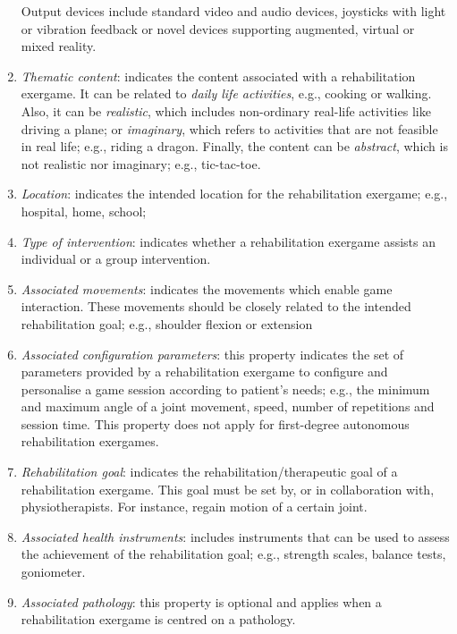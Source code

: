 \begin{enumerate}
    Output devices include standard video and audio devices, joysticks with light or vibration feedback or novel devices supporting augmented, virtual or mixed reality.
    
    \item \emph{Thematic content}: indicates the content associated with a rehabilitation exergame. It can be related to \textit{daily life activities}, e.g., cooking or walking. Also, it can be \textit{realistic}, which includes non-ordinary real-life activities like driving a plane; or \textit{imaginary}, which refers to activities that are not feasible in real life; e.g., riding a dragon. Finally, the content can be \textit{abstract}, which is not realistic nor imaginary; e.g., tic-tac-toe.
    
    \item \emph{Location}: indicates the intended location for the rehabilitation exergame; e.g., hospital, home, school; 
    
    \item \emph{Type of intervention}: indicates whether a rehabilitation exergame assists an individual or a group intervention.
    
    \item \emph{Associated movements}: indicates the movements which enable game interaction. These movements should be closely related to the intended rehabilitation goal; e.g., shoulder flexion or extension
    
    \item \emph{Associated configuration parameters}: this property indicates the set of parameters provided by a rehabilitation exergame to configure and personalise a game session according to patient’s needs; e.g., the minimum and maximum angle of a joint movement, speed, number of repetitions and session time. This property does not apply for first-degree autonomous rehabilitation exergames.
    
    \item \emph{Rehabilitation goal}: indicates the rehabilitation/therapeutic goal of a rehabilitation exergame. This goal must be set by, or in collaboration with, physiotherapists. For instance, regain motion of a certain joint.
    
    \item \emph{Associated health instruments}: includes instruments that can be used to assess the achievement of the rehabilitation goal; e.g., strength scales, balance tests, goniometer.
    
    \item \emph{Associated pathology}: this property is optional and applies when a rehabilitation exergame is centred on a pathology.
\end{enumerate}

